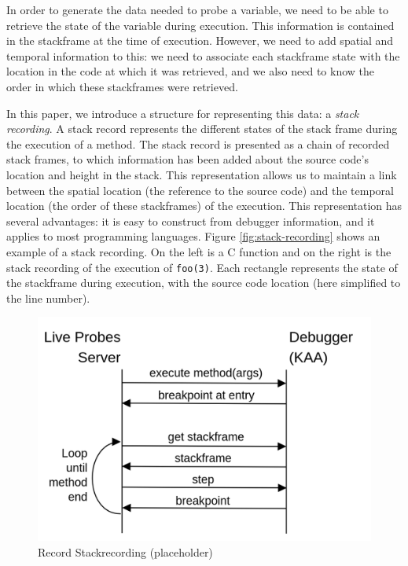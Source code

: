 \documentclass[english,submission]{programming}
\newcommand{\code}[1]{\colorbox{codegray}{\texttt{#1}}}
\begin{document}

In order to generate the data needed to probe a variable, we need to be able to retrieve the state of the variable during execution. 
This information is contained in the stackframe at the time of execution. 
However, we need to add spatial and temporal information to this: we need to associate each stackframe state with the location in the code at which it was retrieved, and we also need to know the order in which these stackframes were retrieved.

In this paper, we introduce a structure for representing this data: a \textit{stack recording}. 
A stack record represents the different states of the stack frame during the execution of a method. The stack record is presented as a chain of recorded stack frames, to which information has been added about the source code's location and height in the stack.
This representation allows us to maintain a link between the spatial location (the reference to the source code) and the temporal location (the order of these stackframes) of the execution.
This representation has several advantages: it is easy to construct from debugger information, and it applies to most programming languages.
Figure \ref{fig:stack-recording} shows an example of a stack recording. On the left is a C function and on the right is the stack recording of the execution of \code{foo(3)}. Each rectangle represents the state of the stackframe during execution, with the source code location (here simplified to the line number).

\begin{figure}[h]
  \centering
  \includegraphics[width=0.6\linewidth]{img/stackrecording_impl.png}
  \caption{Record Stackrecording (placeholder)}
  \label{fig:stack-recording-impl}
\end{figure}
\end{document}
